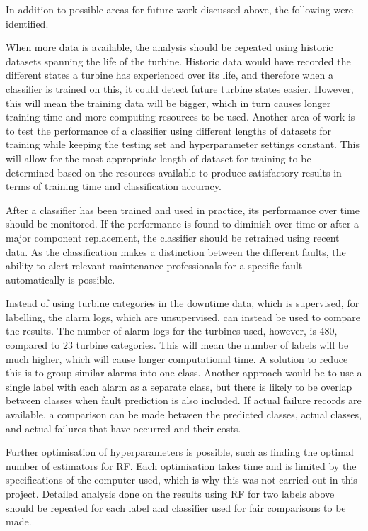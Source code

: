 In addition to possible areas for future work discussed above, the following
were identified.

When more data is available, the analysis should be repeated using historic
datasets spanning the life of the turbine. Historic data would have recorded
the different states a turbine has experienced over its life, and therefore
when a classifier is trained on this, it could detect future turbine states
easier. However, this will mean the training data will be bigger, which in
turn causes longer training time and more computing resources to be used.
Another area of work is to test the performance of a classifier using
different lengths of datasets for training while keeping the testing set and
hyperparameter settings constant. This will allow for the most appropriate
length of dataset for training to be determined based on the resources
available to produce satisfactory results in terms of training time and
classification accuracy.

After a classifier has been trained and used in practice, its performance over
time should be monitored. If the performance is found to diminish over time or
after a major component replacement, the classifier should be retrained using
recent data. As the classification makes a distinction between the different
faults, the ability to alert relevant maintenance professionals for a specific
fault automatically is possible.

Instead of using turbine categories in the downtime data, which is supervised,
for labelling, the alarm logs, which are unsupervised, can instead be used to
compare the results. The number of alarm logs for the turbines used, however,
is 480, compared to 23 turbine categories. This will mean the number of labels
will be much higher, which will cause longer computational time. A solution to
reduce this is to group similar alarms into one class. Another approach would
be to use a single label with each alarm as a separate class, but there is
likely to be overlap between classes when fault prediction is also included.
If actual failure records are available, a comparison can be made between the
predicted classes, actual classes, and actual failures that have occurred and
their costs.

Further optimisation of hyperparameters is possible, such as finding the
optimal number of estimators for RF. Each optimisation takes time and is
limited by the specifications of the computer used, which is why this was not
carried out in this project. Detailed analysis done on the results using RF
for two labels above should be repeated for each label and classifier used for
fair comparisons to be made.

